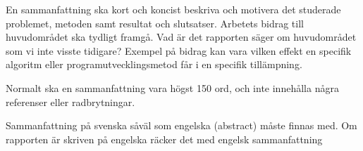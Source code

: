 En sammanfattning ska kort och koncist beskriva och motivera det studerade problemet,
metoden samt resultat och slutsatser. Arbetets bidrag till huvudområdet ska tydligt framgå. Vad är det rapporten säger om huvudområdet som vi inte visste tidigare? Exempel på bidrag kan vara vilken effekt en specifik algoritm eller programutvecklingsmetod får i en specifik tillämpning.

Normalt ska en sammanfattning vara högst 150 ord, och inte innehålla några referenser
eller radbrytningar.

Sammanfattning på svenska såväl som engelska (abstract) måste finnas med. Om
rapporten är skriven på engelska räcker det med engelsk sammanfattning 